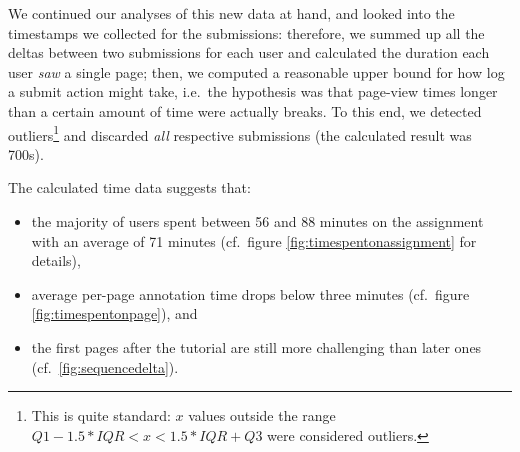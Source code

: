 \begin{longversion}
\noindent \newline
We continued our analyses of this new data at hand, and looked into the timestamps we collected for the submissions:
therefore, we summed up all the deltas between two submissions for each user and calculated the duration each user \emph{saw} a single page;
then, we computed a reasonable upper bound for how log a submit action might take,
i.e.~the hypothesis was that page-view times longer than a certain amount of time were actually breaks.
To this end, we detected outliers\footnote{This is quite standard: $x$ values outside the range $Q1 - 1.5*IQR < x < 1.5*IQR + Q3$ were considered outliers.} and discarded \emph{all} respective submissions (the calculated\cite{r-project} result was 700s).

The calculated time data suggests that:
\begin{itemize}
\item the majority of users spent between 56 and 88 minutes on the assignment with an average of 71 minutes (cf.~figure \ref{fig:timespentonassignment} for details), 
\item average per-page annotation time drops below three minutes (cf.~figure \ref{fig:timespentonpage}), and
\item the first pages after the tutorial are still more challenging than later ones (cf.~\ref{fig:sequencedelta}).
\end{itemize}





%


\end{longversion}
